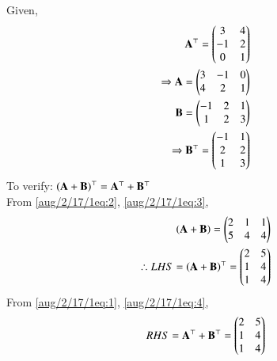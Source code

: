 Given, 
\begin{align}
\mathbf{A}^\top=\begin{pmatrix}
3 & 4 \\
-1 & 2 \\
0 & 1\end{pmatrix}\label{aug/2/17/1eq:1}\\
\Rightarrow \mathbf{A}=\begin{pmatrix}
3 & -1 & 0 \\
4 & 2 & 1\end{pmatrix}\label{aug/2/17/1eq:2}\\
\mathbf{B}=\begin{pmatrix}
-1 & 2 & 1\\
1 & 2 & 3\end{pmatrix}\label{aug/2/17/1eq:3}\\
\Rightarrow \mathbf{B}^\top=\begin{pmatrix}
-1 & 1 \\
2 & 2 \\
1 & 3\end{pmatrix}\label{aug/2/17/1eq:4}
\end{align}
To verify: $\left(\mathbf{A+B}\right)^\top=\mathbf{A}^\top+\mathbf{B}^\top$\\
From \eqref{aug/2/17/1eq:2}, \eqref{aug/2/17/1eq:3},
\begin{align}
\left(\mathbf{A+B}\right)=\begin{pmatrix}
2 & 1 & 1\\
5 & 4 & 4\end{pmatrix}\\
\therefore LHS=\left(\mathbf{A+B}\right)^\top=\begin{pmatrix}
2 & 5 \\
1 & 4 \\
1 & 4\end{pmatrix}
\end{align}
From \eqref{aug/2/17/1eq:1}, \eqref{aug/2/17/1eq:4},
\begin{align}
RHS=\mathbf{A}^\top+\mathbf{B}^\top=\begin{pmatrix}
2 & 5 \\
1 & 4 \\
1 & 4\end{pmatrix}
\end{align}

